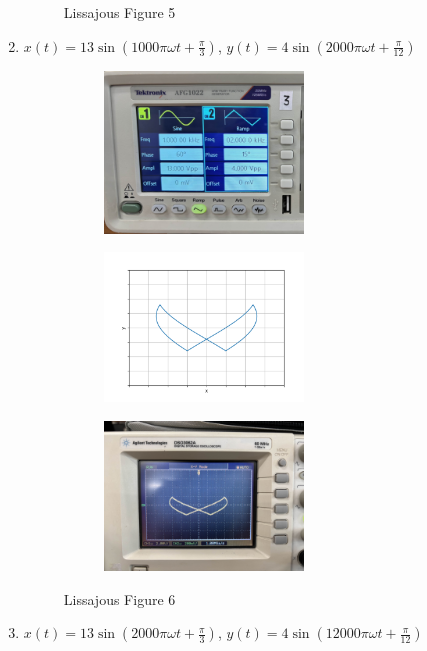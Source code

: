 \documentclass[a4paper,12pt]{article}
\begin{document}
\begin{enumerate}
\begin{figure}[h!]
\begin{subfigure}[b]{10pt}
	\end{subfigure}
	\caption{Lissajous Figure 5}
\end{figure}
	\item $x(t) = 13\sin(1000\pi\omega t + \frac{\pi}{3})$, $y(t) = 4\sin(2000\pi\omega t + \frac{\pi}{12})$\\
\begin{figure}[h!]
	\begin{subfigure}[b]{10pt}
		\includegraphics[width = 150pt]{figs/fig6.jpeg}
	\end{subfigure}
	\hspace{135pt}
	\begin{subfigure}[b]{10pt}
		\includegraphics[width = 150pt]{figs/fig6.png}
	\end{subfigure}
	\hspace{135pt}
	\begin{subfigure}[b]{10pt}
		\includegraphics[width = 150pt]{figs/fig6_1.jpeg}
	\end{subfigure}
	\caption{Lissajous Figure 6}
\end{figure}
	\pagebreak
	\item $x(t) = 13\sin(2000\pi\omega t + \frac{\pi}{3})$, $y(t) = 4\sin(12000\pi\omega t + \frac{\pi}{12})$\\
\begin{figure}[h!]

\end{figure}
\end{enumerate}
\end{document}
